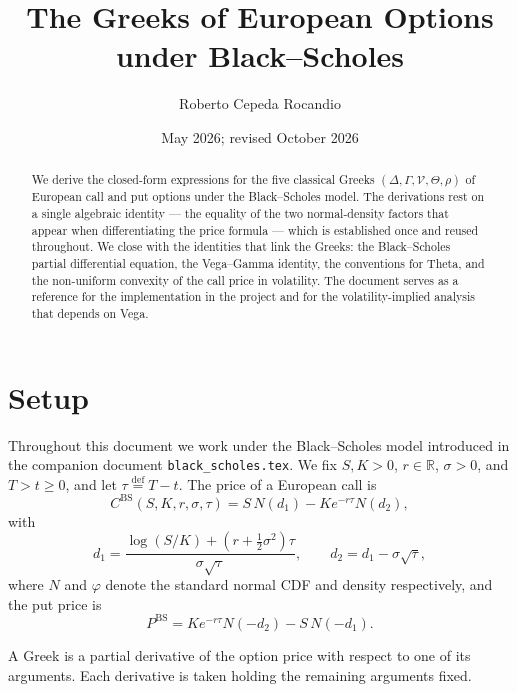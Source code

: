 \documentclass[11pt,a4paper]{article}
\title{The Greeks of European Options under Black--Scholes}
\author{Roberto Cepeda Rocandio}
\date{May 2026; revised October 2026}
\theoremstyle{plain}
\theoremstyle{definition}
\theoremstyle{remark}
\newcommand{\R}{\mathbb{R}}
\newcommand{\eqdef}{\overset{\mathrm{def}}{=}}
\newcommand{\BS}{\mathrm{BS}}
\newcommand{\Vega}{\mathcal{V}}
\begin{document}
\maketitle

\begin{abstract}
We derive the closed-form expressions for the five classical Greeks
\((\Delta, \Gamma, \Vega, \Theta, \rho)\) of European call and put
options under the Black--Scholes model. The derivations rest on a
single algebraic identity --- the equality of the two normal-density
factors that appear when differentiating the price formula --- which
is established once and reused throughout. We close with the
identities that link the Greeks: the Black--Scholes partial differential
equation, the Vega--Gamma identity, the conventions for Theta, and the
non-uniform convexity of the call price in volatility. The document
serves as a reference for the implementation in the project and for
the volatility-implied analysis that depends on Vega.
\end{abstract}

\section{Setup}

Throughout this document we work under the Black--Scholes model
introduced in the companion document \texttt{black\_scholes.tex}. We
fix \(S, K > 0\), \(r \in \R\), \(\sigma > 0\), and \(T > t \geq 0\),
and let \(\tau \eqdef T - t\). The price of a European call is
\begin{equation}
    C^{\BS}(S, K, r, \sigma, \tau)
    = S\, N(d_1) - K e^{-r\tau} N(d_2),
    \label{eq:bs}
\end{equation}
with
\begin{equation}
    d_1 = \frac{\log(S/K) + (r + \tfrac{1}{2}\sigma^2)\tau}{\sigma\sqrt{\tau}},
    \qquad
    d_2 = d_1 - \sigma\sqrt{\tau},
    \label{eq:d1d2}
\end{equation}
where \(N\) and \(\varphi\) denote the standard normal CDF and density
respectively, and the put price is
\begin{equation}
    P^{\BS} = K e^{-r\tau} N(-d_2) - S\, N(-d_1).
    \label{eq:put}
\end{equation}

A Greek is a partial derivative of the option price with respect to one
of its arguments. Each derivative is taken holding the remaining
arguments fixed.
\end{document}
